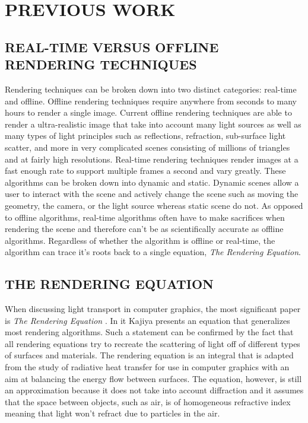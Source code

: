 \chapter{PREVIOUS WORK} \label{sec:prevwork}

\section{REAL-TIME VERSUS OFFLINE RENDERING TECHNIQUES}

Rendering techniques can be broken down into two distinct categories: real-time and offline.  Offline rendering techniques require anywhere from seconds to many hours to render a single image.  Current offline rendering techniques are able to render a ultra-realistic image that take into account many light sources as well as many types of light principles such as reflections, refraction, sub-surface light scatter, and more in very complicated scenes consisting of millions of triangles and at fairly high resolutions.  Real-time rendering techniques render images at a fast enough rate to support multiple frames a second and vary greatly.  These algorithms can be broken down into dynamic and static.  Dynamic scenes allow a user to interact with the scene and actively change the scene such as moving the geometry, the camera, or the light source whereas static scene do not.  As opposed to offline algorithms, real-time algorithms often have to make sacrifices when rendering the scene and therefore can't be as scientifically accurate as offline algorithms.  Regardless of whether the algorithm is offline or real-time, the algorithm can trace it's roots back to a single equation, \textit{The Rendering Equation}.

\section{THE RENDERING EQUATION} \label{sec:render}

When discussing light transport in computer graphics, the most significant paper is \textit{The Rendering Equation} \cite{Kajiya1986}.  In it Kajiya presents an equation that generalizes most rendering algorithms.  Such a statement can be confirmed by the fact that all rendering equations try to recreate the scattering of light off of different types of surfaces and materials.  The rendering equation is an integral that is adapted from the study of radiative heat transfer for use in computer graphics with an aim at balancing the energy flow between surfaces.  The equation, however, is still an approximation because it does not take into account diffraction and it assumes that the space between objects, such as air, is of homogeneous refractive index meaning that light won't refract due to particles in the air.

